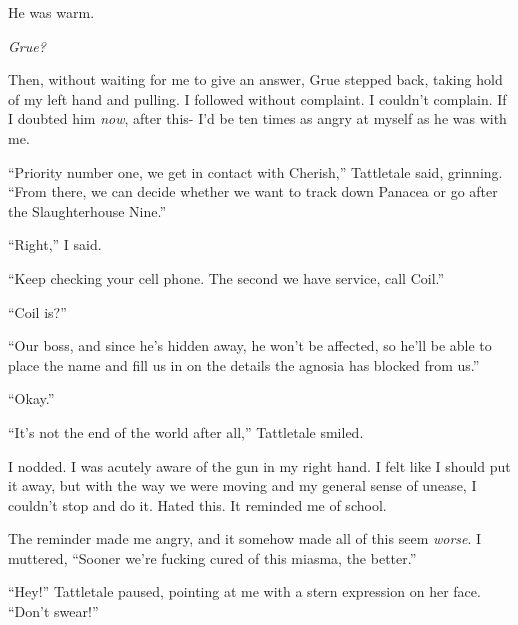 He was warm.



\emph{Grue?}



Then, without waiting for me to give an answer, Grue stepped back, taking hold of my left hand and pulling.  I followed without complaint.  I couldn't complain.  If I doubted him \emph{now}, after this-  I'd be ten times as angry at myself as he was with me.



``Priority number one, we get in contact with Cherish,'' Tattletale said, grinning.  ``From there, we can decide whether we want to track down Panacea or go after the Slaughterhouse Nine.''



``Right,'' I said.



``Keep checking your cell phone.  The second we have service, call Coil.''



``Coil is?''



``Our boss, and since he's hidden away, he won't be affected, so he'll be able to place the name and fill us in on the details the agnosia has blocked from us.''



``Okay.''



``It's not the end of the world after all,'' Tattletale smiled.



I nodded.  I was acutely aware of the gun in my right hand.  I felt like I should put it away, but with the way we were moving and my general sense of unease, I couldn't stop and do it.  Hated this.  It reminded me of school.



The reminder made me angry, and it somehow made all of this seem \emph{worse}.  I muttered, ``Sooner we're fucking cured of this miasma, the better.''



``Hey!''  Tattletale paused, pointing at me with a stern expression on her face.  ``Don't swear!''





